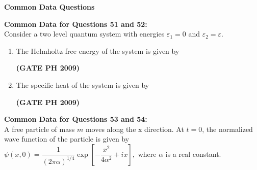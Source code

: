 \documentclass[14pt, a4paper]{extarticle}
\begin{document}
\vspace{1.5em}
\noindent
\textbf{Common Data Questions}
\vspace{1em}

\noindent
\textbf{Common Data for Questions 51 and 52:} \\
Consider a two level quantum system with energies $\varepsilon_1 = 0$ and $\varepsilon_2 = \varepsilon$.

\begin{enumerate}[label=\textbf{Q. \arabic*}, start=51]

\item The Helmholtz free energy of the system is given by
\begin{enumerate}
\end{enumerate}
\hfill \textbf{(GATE PH 2009)}

\item The specific heat of the system is given by
\begin{enumerate}
\end{enumerate}
\hfill \textbf{(GATE PH 2009)}

\end{enumerate}

\vspace{1.5em}
\noindent
\textbf{Common Data for Questions 53 and 54:} \\
A free particle of mass $m$ moves along the x direction.
At $t=0$, the normalized wave function of the particle is given by
$ \psi(x,0) = \dfrac{1}{(2\pi\alpha)^{1/4}}\exp\left[-\dfrac{x^2}{4\alpha^2} + ix\right], $
where $\alpha$ is a real constant.
\end{document}
